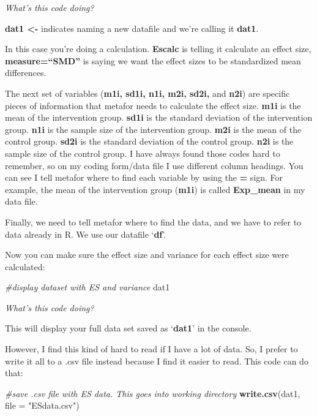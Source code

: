 \documentclass[
]{book}
\newenvironment{Shaded}{\begin{snugshade}}{\end{snugshade}}
\newcommand{\AttributeTok}[1]{\textcolor[rgb]{0.13,0.29,0.53}{#1}}
\newcommand{\CommentTok}[1]{\textcolor[rgb]{0.56,0.35,0.01}{\textit{#1}}}
\newcommand{\FunctionTok}[1]{\textcolor[rgb]{0.13,0.29,0.53}{\textbf{#1}}}
\newcommand{\NormalTok}[1]{#1}
\newcommand{\StringTok}[1]{\textcolor[rgb]{0.31,0.60,0.02}{#1}}
\begin{document}
\emph{What's this code doing?}

\textbf{dat1 \textless-} indicates naming a new datafile and we're calling it \textbf{dat1}.

In this case you're doing a calculation. \textbf{Escalc} is telling it calculate an effect size, \textbf{measure=``SMD''} is saying we want the effect sizes to be standardized mean differences.

The next set of variables (\textbf{m1i, sd1i, n1i, m2i, sd2i,} and \textbf{n2i}) are specific pieces of information that metafor needs to calculate the effect size. \textbf{m1i} is the mean of the intervention group. \textbf{sd1i} is the standard deviation of the intervention group. \textbf{n1i} is the sample size of the intervention group. \textbf{m2i} is the mean of the control group. \textbf{sd2i} is the standard deviation of the control group. \textbf{n2i} is the sample size of the control group. I have always found those codes hard to remember, so on my coding form/data file I use different column headings. You can see I tell metafor where to find each variable by using the \textbf{=} sign. For example, the mean of the intervention group (\textbf{m1i}) is called \textbf{Exp\_mean} in my data file.

Finally, we need to tell metafor where to find the data, and we have to refer to data already in R. We use our datafile `\textbf{df}'.

Now you can make sure the effect size and variance for each effect size were calculated:

\begin{Shaded}
\begin{Highlighting}[]
\CommentTok{\#display dataset with ES and variance}
\NormalTok{dat1}
\end{Highlighting}
\end{Shaded}

\emph{What's this code doing?}

This will display your full data set saved as `\textbf{dat1}' in the console.

However, I find this kind of hard to read if I have a lot of data. So, I prefer to write it all to a .csv file instead because I find it easier to read. This code can do that:

\begin{Shaded}
\begin{Highlighting}[]
\CommentTok{\#save .csv file with ES data. This goes into working directory}
\FunctionTok{write.csv}\NormalTok{(dat1, }\AttributeTok{file =} \StringTok{"ESdata.csv"}\NormalTok{)}
\end{Highlighting}
\end{Shaded}
\end{document}
